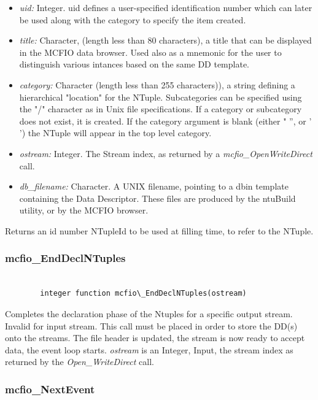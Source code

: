\begin{itemize}
\item {\em uid:} Integer. uid defines a user-specified identification number
 which can later be used along with the category to specify the item created.
\item {\em title:} Character, (length less than 80 characters), a title that can be displayed
in the MCFIO data browser.  Used also as a mnemonic for the user to distinguish
various intances based on the same DD template.
\item {\em category:} Character (length less than 255 characters)), a string defining a
hierarchical "location" for the NTuple. Subcategories can be
specified using the "/" character as in Unix file specifications.
If a category or subcategory does not exist, it is created.
If the category argument is blank (either " '', or ' ') the NTuple will
appear in the top level category.
\item {\em ostream:} Integer. The Stream index, as returned by a
{\em mcfio\_OpenWriteDirect}  call.
\item{\em db\_filename:} Character. A UNIX filename, pointing to a dbin template
containing the Data Descriptor.  These files are produced by
the ntuBuild utility, or by the MCFIO browser.
\end{itemize}


    Returns an id number NTupleId to be used at filling time, to refer to the NTuple.

\subsubsection{mcfio\_EndDeclNTuples}

\begin{verbatim}

        integer function mcfio\_EndDeclNTuples(ostream)

\end{verbatim}

Completes the declaration phase of the Ntuples for a specific output stream.
Invalid for input stream.  This call must be placed in order to store
the DD(s) onto the streams.  The file header is updated, the stream is
now ready to accept data, the event loop starts.  {\em ostream} is
an Integer, Input, the stream index as returned by the
{\em Open\_WriteDirect} call.



\subsubsection{mcfio\_NextEvent}

